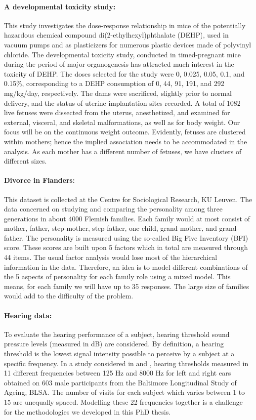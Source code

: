 \documentclass[14pt]{article}
\begin{document}
\paragraph*{A developmental toxicity study:} This study investigates the dose-response
relationship in mice of the potentially hazardous chemical compound di(2-ethylhexyl)phthalate
(DEHP), used in vacuum pumps and as plasticizers for numerous plastic devices made of polyvinyl chloride. The developmental toxicity study, conducted in timed-pregnant
mice during the period of major organogenesis has attracted
much interest in the toxicity of DEHP. The doses selected for the study were 0, 0.025, 0.05, 0.1,
and 0.15\%, corresponding to a DEHP consumption of 0, 44, 91, 191, and 292 mg/kg/day, respectively.
The dams were sacrificed, slightly prior to normal delivery, and the status of uterine implantation sites recorded. A total of 1082 live fetuses were dissected from the uterus, anesthetized, and examined for external, visceral, and skeletal malformations, as well as for body
weight. Our focus will be on the continuous weight outcome. Evidently, fetuses are clustered within mothers; hence the implied association needs to be accommodated in the analysis. As each mother has a different number of fetuses, we have clusters of different sizes. 


\paragraph*{Divorce in Flanders:} This dataset is collected at the Centre for Sociological Research, KU Leuven. The data concerned on studying and comparing the personality among
three generations in about 4000 Flemish families. Each family would at most consist of mother, father, step-mother, step-father, one child, grand mother, and grand-father. The personality is measured using the so-called
Big Five Inventory (BFI) score. These scores are built upon 5 factors which in total are measured through 44 items. The usual factor analysis would lose most of the hierarchical information in the data. Therefore, an idea is to model different combinations of the 5 aspects of personality for each family role using a mixed model. This means, for each family we will have up to 35 responses. The large size of families would add to the difficulty of the problem.

\paragraph*{Hearing data:} To evaluate the hearing performance of a subject, hearing threshold sound pressure levels (measured in dB) are considered. By definition, a hearing threshold is the lowest signal intensity possible to perceive by a subject at a specific frequency. In a study considered in \cite{verbeke2009} and \cite{Verbeke2006}, hearing thresholds measured in 11 different frequencies between 125 Hz and 8000 Hz for left and right ears obtained on 603 male participants from the Baltimore Longitudinal Study of Ageing, BLSA. The number of visits for each subject which varies between 1 to 15 are unequally spaced. Modelling these 22 frequencies together is a challenge for the methodologies we developed in this PhD thesis.
\end{document}
